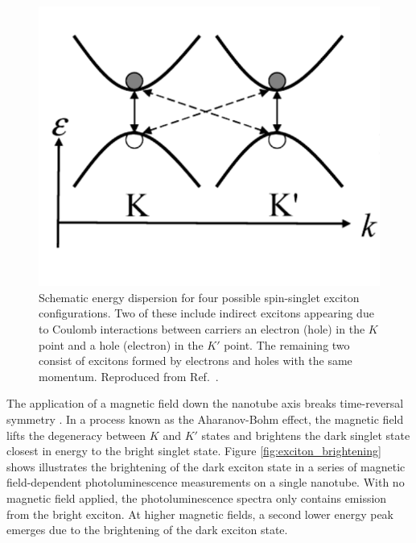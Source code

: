 \begin{figure}[ht]
	\centering
	\includegraphics[scale=0.4]{images/chapter_optical_props/exciton_schematic_srivastava}
	\caption{Schematic energy dispersion for four possible spin-singlet exciton configurations. Two of these include indirect excitons appearing due to Coulomb interactions between carriers an electron (hole) in the $K$ point and a hole (electron) in the $K'$ point. The remaining two consist of excitons formed by electrons and holes with the same momentum. Reproduced from Ref.\ \cite{srivastava2008direct}.}
	\label{fig:exciton_transitions}
\end{figure}

The application of a magnetic field down the nanotube axis breaks time-reversal symmetry \cite{srivastava2008direct}. In a process known as the Aharanov-Bohm effect, the magnetic field lifts the degeneracy between $K$ and $K'$ states and brightens the dark singlet state closest in energy to the bright singlet state. Figure \ref{fig:exciton_brightening} shows illustrates the brightening of the dark exciton state in a series of magnetic field-dependent photoluminescence measurements on a single nanotube. With no magnetic field applied, the photoluminescence spectra only contains emission from the bright exciton. At higher magnetic fields, a second lower energy peak emerges due to the brightening of the dark exciton state.  

